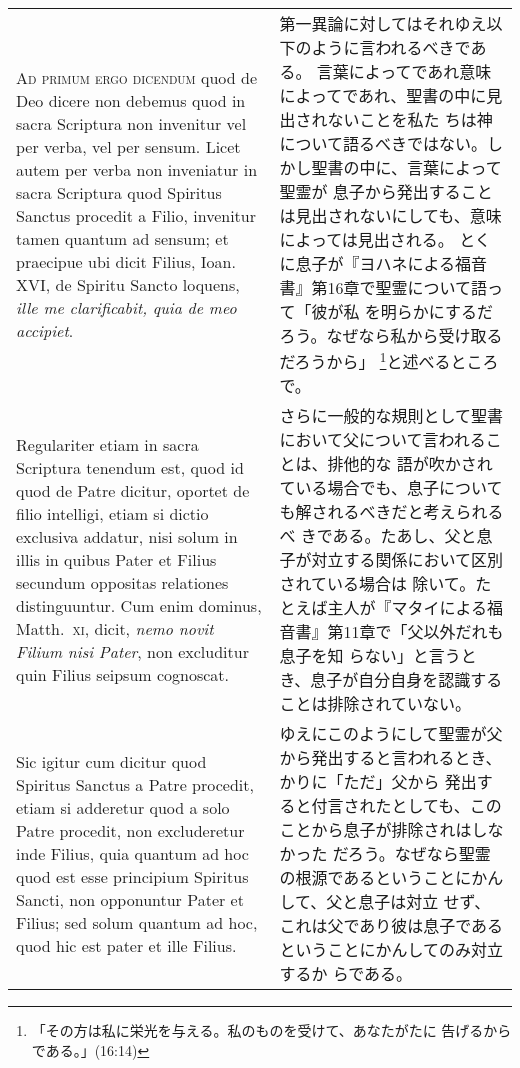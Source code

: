 \documentclass[10pt]{jsarticle} %
\begin{document}
\begin{longtable}{p{21em}p{21em}}
\\



{\scshape Ad primum ergo dicendum} quod de Deo dicere non debemus quod in sacra
Scriptura non invenitur vel per verba, vel per sensum. Licet autem per
verba non inveniatur in sacra Scriptura quod Spiritus
Sanctus procedit a Filio, invenitur tamen quantum ad sensum; et
praecipue ubi dicit Filius, Ioan. XVI, de  Spiritu Sancto loquens, {\itshape ille
me clarificabit, quia de meo accipiet}. 


&

第一異論に対してはそれゆえ以下のように言われるべきである。
言葉によってであれ意味によってであれ、聖書の中に見出されないことを私た
 ちは神について語るべきではない。しかし聖書の中に、言葉によって聖霊が
 息子から発出することは見出されないにしても、意味によっては見出される。
 とくに息子が『ヨハネによる福音書』第16章で聖霊について語って「彼が私
 を明らかにするだろう。なぜなら私から受け取るだろうから」
 \footnote{「その方は私に栄光を与える。私のものを受けて、あなたがたに
 告げるからである。」(16:14)}と述べるところで。

\\

Regulariter etiam in sacra
Scriptura tenendum est, quod id quod de Patre dicitur, oportet de
filio intelligi, etiam si dictio exclusiva addatur, nisi solum in
illis in quibus Pater et Filius secundum oppositas relationes
distinguuntur. Cum enim dominus, Matth.~{\scshape xi}, dicit, {\itshape nemo novit Filium
nisi Pater}, non excluditur quin Filius seipsum cognoscat. 


&

さらに一般的な規則として聖書において父について言われることは、排他的な
語が吹かされている場合でも、息子についても解されるべきだと考えられるべ
 きである。たあし、父と息子が対立する関係において区別されている場合は
 除いて。たとえば主人が『マタイによる福音書』第11章で「父以外だれも息子を知
 らない」と言うとき、息子が自分自身を認識することは排除されていない。

\\

Sic igitur
cum dicitur quod Spiritus Sanctus a Patre procedit, etiam
si adderetur quod a solo Patre procedit, non excluderetur inde Filius,
quia quantum ad hoc quod est esse principium  Spiritus Sancti, non
opponuntur Pater et Filius; sed solum quantum ad hoc, quod hic est
pater et ille Filius.

&

ゆえにこのようにして聖霊が父から発出すると言われるとき、かりに「ただ」父から
 発出すると付言されたとしても、このことから息子が排除されはしなかった
 だろう。なぜなら聖霊の根源であるということにかんして、父と息子は対立
 せず、これは父であり彼は息子であるということにかんしてのみ対立するか
 らである。



\end{longtable}
\end{document}
